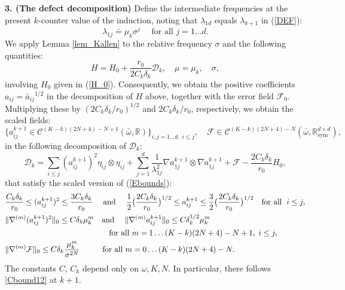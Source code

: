 \documentclass[reqno,twoside,11pt]{amsart}
\newcommand{\sym}{\mathrm{sym}}
\newcommand{\R}{\mathbb{R}}
\numberwithin{equation}{section}
\theoremstyle{plain}
\theoremstyle{definition}
\begin{document}
{\bf 3. (The defect decomposition)} Define the intermediate
frequencies at the present $k$-counter value of the induction, noting that
$\lambda_{1d}$ equals $\lambda_{k+1}$ in  (\ref{DEF}):
$$\lambda_{1j} \doteq \mu_k\sigma^j \quad\mbox{ for all } j=1\ldots d.$$
We apply Lemma \ref{lem_Kallen} to the relative
frequency $\sigma$ and the following quantities: 
$$H= H_0+\frac{r_0}{2C_k\delta_k}\mathcal{D}_k, \quad \mu=\mu_k, \quad \sigma,$$
involving $H_0$ given in (\ref{H_0}). Consequently, 
we obtain the positive coefficients $a_{ij} = {\bar a_{ij}}^{1/2}$ in the
decomposition of $H$ above, together with the 
error field $\mathcal{F}_0$. Multiplying these by
$(2C_k\delta_k/r_0)^{1/2}$ and $2C_k\delta_k/r_0$, respectively, we obtain the scaled fields:
$$\{a_{ij}^{k+1}\in\mathcal{C}^{(K-k)(2N+4)-N+1}(\bar\omega, \R)\}_{i,j=1\ldots
  d,\; i\leq j}, \quad \mathcal{F}
\in \mathcal{C}^{(K-k)(2N+4)-N}(\bar\omega, \R^{d\times d}_\sym),$$ 
in the following decomposition of $\mathcal{D}_k$:
\begin{equation}\label{def1}
\mathcal{D}_k = \sum_{i\leq j} (a_{ij}^{k+1})^2\eta_{ij}\otimes
\eta_{ij}+\sum_{j=1}^d\frac{1}{\lambda_{1j}^2} \nabla a_{1j}^{k+1}\otimes \nabla a_{1j}^{k+1}
+\mathcal{F} - \frac{2C_k\delta_k}{r_0}H_0,
\end{equation}
that satisfy the scaled version of (\ref{Ebounds}):
\begin{equation}\label{Fbounds}
\begin{split}
&  \frac{C_k\delta_k}{r_0}\leq (a_{ij}^{k+1})^2\leq
\frac{3C_k\delta_k}{r_0} \quad\mbox{ and }\quad  
\frac{1}{2}\big(\frac{2C_k\delta_k}{r_0}\big)^{1/2}
\leq a_{ij}^{k+1}\leq \frac{3}{2} \big(\frac{2C_k\delta_k}{r_0}\big)^{1/2}
\quad  \mbox{for all } \;  i\leq j,\\
& \|\nabla^{(m)} (a_{ij}^{k+1})^2\|_0\leq C\delta_k\mu_k^m\quad 
\mbox{and } \quad \|\nabla^{(m)} a_{ij}^{k+1}\|_0\leq
C\delta_k^{1/2}\mu_k^m \\
& \hspace{4.55cm}\mbox{ for all }  m=1\ldots (K-k)(2N+4)-N+1,\;  i\leq j,\\
& \|\nabla^{(m)}\mathcal{F}\|_0\leq
C\delta_k\frac{\mu_k^m}{\sigma^{2N}}\hspace{9mm}\mbox{ for all } m=0\ldots (K-k)(2N+4)-N.  
\end{split}
\end{equation}
The constants $C$, $C_k$ depend only on $\omega, K, N$.
In particular, there follows \ref{Cbound12} at $k+1$.

\medskip
\end{document}
